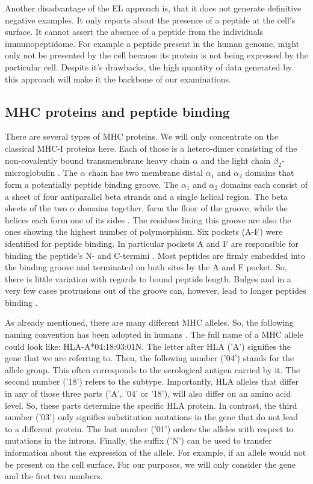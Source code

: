 \documentclass[msc,deptreport,ai]{infthesis} %
\begin{document}
		Another disadvantage of the \gls{EL} approach is, that it does not generate definitive negative examples. It only reports about the presence of a peptide at the cell's surface. It cannot assert the absence of a peptide from the individuals immunopeptidome. For example a peptide present in the human genome, might only not be presented by the cell because its protein is not being expressed by the particular cell. Despite it's drawbacks, the high quantity of data generated by this approach will make it the backbone of our examinations.
	
	\subsection{MHC proteins and peptide binding}
	\label{subsec:bg_biology_mhc}
		There are several types of \gls{MHC} proteins. We will only concentrate on the classical \gls{MHC-I} proteins here. Each of those is a hetero-dimer consisting of the non-covalently bound transmembrane heavy chain $\alpha$ and the light chain $\beta_2$-microglobulin \cite{stryhn_longer_2000}. The $\alpha$ chain has two membrane distal $\alpha_1$ and $\alpha_2$ domains that form a potentially peptide binding groove. The $\alpha_1$ and $\alpha_2$ domains each consist of a sheet of four antiparallel beta strands and a single helical region. The beta sheets of the two $\alpha$ domains together, form the floor of the groove, while the helices each form one of its sides \cite{lefranc_imgt_2005}. The residues lining this groove are also the ones showing the highest number of polymorphism. Six pockets (A-F) were identified for peptide binding. In particular pockets A and F are responsible for binding the peptide's N- and C-termini \cite{stryhn_longer_2000}. Most peptides are firmly embedded into the binding groove and terminated on both sites by the A and F pocket. So, there is little variation with regards to bound peptide length. Bulges and in a very few cases protrusions out of the groove can, however, lead to longer peptides binding \cite{stryhn_longer_2000}.
	
		As already mentioned, there are many different MHC alleles. So, the following naming convention has been adopted in humans \cite{hla_informatics_group_hla_nodate}. The full name of a MHC allele could look like: HLA-A*04:18:03:01N. The letter after \gls{HLA} ('A') signifies the gene that we are referring to. Then, the following number ('04') stands for the allele group. This often corresponds to the serological antigen carried by it. The second number ('18') refers to the subtype. Importantly, \gls{HLA} alleles that differ in any of those three parts ('A', '04' or '18'), will also differ on an amino acid level. So, these parts determine the specific \gls{HLA} protein. In contrast, the third number ('03') only signifies substitution mutations in the gene that do not lead to a different protein. The last number ('01') orders the alleles with respect to mutations in the introns. Finally, the suffix ('N') can be used to transfer information about the expression of the allele. For example, if an allele would not be present on the cell surface. For our purposes, we will only consider the gene and the first two numbers.
			
\end{document}
